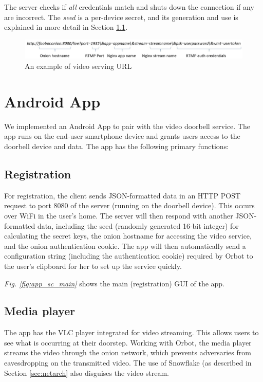 The server checks if \textit{all} credentials match and shuts down the connection if any are incorrect. The \textit{seed} is a per-device secret, and its generation and use is explained in more detail in Section \ref{sec:registration}.

\begin{figure}
	\includegraphics[width=\linewidth]{fig_url.jpg}
	\caption{An example of video serving URL}
	\label{fig:url}
\end{figure}



\section{Android App}
We implemented an Android App to pair with the video doorbell service. The app runs on the end-user smartphone device and grants users access to the doorbell device and data. The app has the following primary functions:

\subsection{Registration} 
\label{sec:registration}
For registration, the client sends JSON-formatted data in an HTTP POST request to port 8080 of the server (running on the doorbell device). This occurs over WiFi in the user's home. The server will then respond with another JSON-formatted data, including the seed (randomly generated 16-bit integer) for calculating the secret keys, the onion hostname for accessing the video service, and the onion authentication cookie. The app will then automatically send a configuration string (including the authentication cookie) required by Orbot to the user’s clipboard for her to set up the service quickly. 

\textit{Fig. \ref{fig:app_sc_main}} shows the main (registration) GUI of the app.


\subsection{Media player} The app has the VLC player integrated for video streaming. This allows users to see what is occurring at their doorstep. Working with Orbot, the media player streams the video through the onion network, which prevents adversaries from eavesdropping on the transmitted video. The use of Snowflake (as described in Section \ref{sec:netarch} also disguises the video stream.

